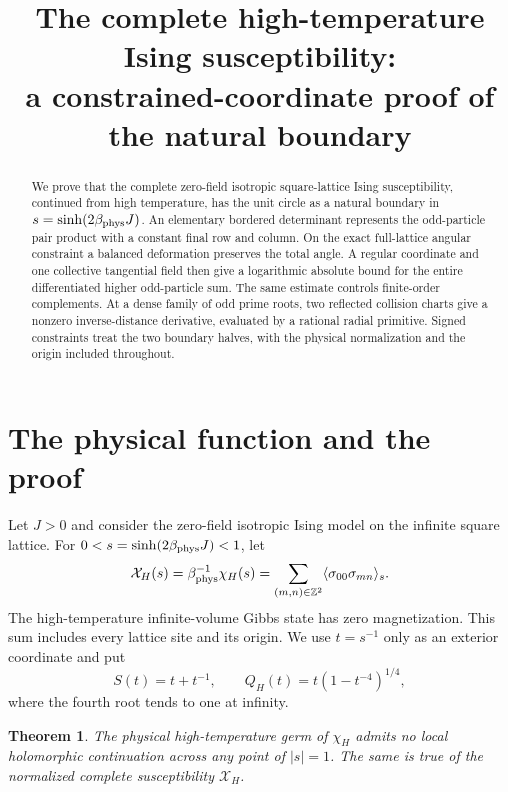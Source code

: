 \documentclass[11pt]{article}
\title{The complete high-temperature Ising susceptibility:\\ a constrained-coordinate proof of the natural boundary}
\author{}\date{}
\numberwithin{equation}{section}
\newtheorem{theorem}{Theorem}[section]
\theoremstyle{remark}\newtheorem{remark}[theorem]{Remark}
\newcommand{\X}{\mathcal X_H}
\begin{document}
\maketitle
\begin{abstract}
We prove that the complete zero-field isotropic square-lattice Ising
susceptibility, continued from high temperature, has the unit circle
as a natural boundary in $s=\sinh(2\beta_{\rm phys}J)$.
An elementary bordered determinant represents the odd-particle
pair product with a constant final row and column. On the exact
full-lattice angular constraint a balanced deformation preserves the
total angle. A regular coordinate and one collective tangential field
then give a logarithmic absolute bound for the entire differentiated
higher odd-particle sum. The same estimate controls finite-order
complements. At a dense family of odd prime roots, two reflected
collision charts give a nonzero inverse-distance derivative, evaluated
by a rational radial primitive. Signed constraints treat the two
boundary halves, with the physical normalization and the origin
included throughout.
\end{abstract}

\section{The physical function and the proof}
Let $J>0$ and consider the zero-field isotropic Ising model on the
infinite square lattice. For $0<s=\sinh(2\beta_{\rm phys}J)<1$,
let
\[
 \X(s)=\beta_{\rm phys}^{-1}\chi_H(s)
       =\sum_{(m,n)\in\mathbb Z^2}\langle\sigma_{00}\sigma_{mn}\rangle_s.
\]
The high-temperature infinite-volume Gibbs state has zero
magnetization. This sum includes every lattice site and its origin.
We use $t=s^{-1}$ only as an exterior coordinate and put
\[
 S(t)=t+t^{-1},\qquad Q_H(t)=t(1-t^{-4})^{1/4},
\]
where the fourth root tends to one at infinity.

\begin{theorem}\label{thm:main}
The physical high-temperature germ of $\chi_H$ admits no local
holomorphic continuation across any point of $|s|=1$.
The same is true of the normalized complete susceptibility $\X$.
\end{theorem}
\end{document}
